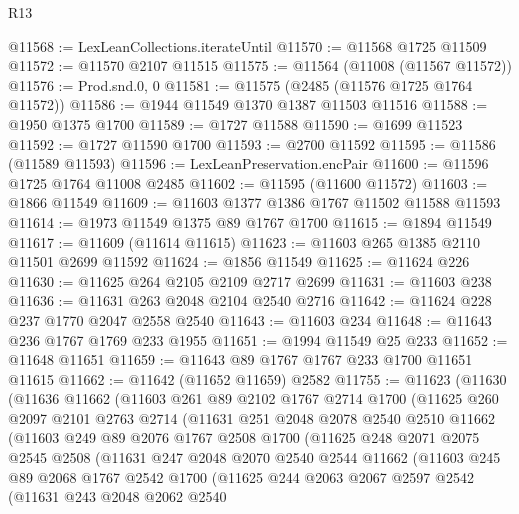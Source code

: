 \begin{lexlean}{R13}
\begin{coremodule}
@11568 := LexLeanCollections.iterateUntil
@11570 := @11568 @1725 @11509
@11572 := @11570 @2107 @11515
@11575 := @11564 (@11008 (@11567 @11572))
@11576 := Prod.snd.{0, 0}
@11581 := @11575 (@2485 (@11576 @1725 @1764 @11572))
@11586 := @1944 @11549 @1370 @1387 @11503 @11516
@11588 := @1950 @1375 @1700
@11589 := @1727 @11588
@11590 := @1699 @11523
@11592 := @1727 @11590 @1700
@11593 := @2700 @11592
@11595 := @11586 (@11589 @11593)
@11596 := LexLeanPreservation.encPair
@11600 := @11596 @1725 @1764 @11008 @2485
@11602 := @11595 (@11600 @11572)
@11603 := @1866 @11549
@11609 := @11603 @1377 @1386 @1767 @11502 @11588 @11593
@11614 := @1973 @11549 @1375 @89 @1767 @1700
@11615 := @1894 @11549
@11617 := @11609 (@11614 @11615)
@11623 := @11603 @265 @1385 @2110 @11501 @2699 @11592
@11624 := @1856 @11549
@11625 := @11624 @226
@11630 := @11625 @264 @2105 @2109 @2717 @2699
@11631 := @11603 @238
@11636 := @11631 @263 @2048 @2104 @2540 @2716
@11642 := @11624 @228 @237 @1770 @2047 @2558 @2540
@11643 := @11603 @234
@11648 := @11643 @236 @1767 @1769 @233 @1955
@11651 := @1994 @11549 @25 @233
@11652 := @11648 @11651
@11659 := @11643 @89 @1767 @1767 @233 @1700 @11651 @11615
@11662 := @11642 (@11652 @11659) @2582
@11755 := @11623
    (@11630
      (@11636
        @11662
        (@11603
          @261
          @89
          @2102
          @1767
          @2714
          @1700
          (@11625
            @260
            @2097
            @2101
            @2763
            @2714
            (@11631
              @251
              @2048
              @2078
              @2540
              @2510
              @11662
              (@11603
                @249
                @89
                @2076
                @1767
                @2508
                @1700
                (@11625
                  @248
                  @2071
                  @2075
                  @2545
                  @2508
                  (@11631
                    @247
                    @2048
                    @2070
                    @2540
                    @2544
                    @11662
                    (@11603
                      @245
                      @89
                      @2068
                      @1767
                      @2542
                      @1700
                      (@11625
                        @244
                        @2063
                        @2067
                        @2597
                        @2542
                        (@11631
                          @243
                          @2048
                          @2062
                          @2540

\end{coremodule}
\end{lexlean}
